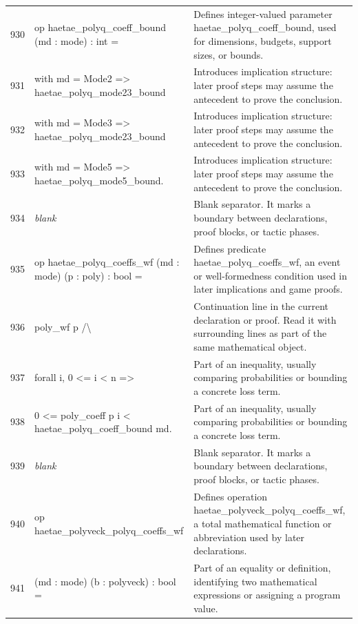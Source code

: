 \documentclass[10pt]{article}
\begin{document}
\begin{longtable}{r L{0.53\textwidth} L{0.37\textwidth}}
930 & {\ttfamily\scriptsize op haetae\_polyq\_coeff\_bound (md : mode) : int =} & Defines integer-valued parameter haetae\_polyq\_coeff\_bound, used for dimensions, budgets, support sizes, or bounds. \\
931 & {\ttfamily\scriptsize   with md = Mode2 => haetae\_polyq\_mode23\_bound} & Introduces implication structure: later proof steps may assume the antecedent to prove the conclusion. \\
932 & {\ttfamily\scriptsize   with md = Mode3 => haetae\_polyq\_mode23\_bound} & Introduces implication structure: later proof steps may assume the antecedent to prove the conclusion. \\
933 & {\ttfamily\scriptsize   with md = Mode5 => haetae\_polyq\_mode5\_bound.} & Introduces implication structure: later proof steps may assume the antecedent to prove the conclusion. \\
934 & {\ttfamily\scriptsize \emph{blank}} & Blank separator.  It marks a boundary between declarations, proof blocks, or tactic phases. \\
935 & {\ttfamily\scriptsize op haetae\_polyq\_coeffs\_wf (md : mode) (p : poly) : bool =} & Defines predicate haetae\_polyq\_coeffs\_wf, an event or well-formedness condition used in later implications and game proofs. \\
936 & {\ttfamily\scriptsize   poly\_wf p /\textbackslash{}} & Continuation line in the current declaration or proof.  Read it with surrounding lines as part of the same mathematical object. \\
937 & {\ttfamily\scriptsize   forall i, 0 <= i < n =>} & Part of an inequality, usually comparing probabilities or bounding a concrete loss term. \\
938 & {\ttfamily\scriptsize     0 <= poly\_coeff p i < haetae\_polyq\_coeff\_bound md.} & Part of an inequality, usually comparing probabilities or bounding a concrete loss term. \\
939 & {\ttfamily\scriptsize \emph{blank}} & Blank separator.  It marks a boundary between declarations, proof blocks, or tactic phases. \\
940 & {\ttfamily\scriptsize op haetae\_polyveck\_polyq\_coeffs\_wf} & Defines operation haetae\_polyveck\_polyq\_coeffs\_wf, a total mathematical function or abbreviation used by later declarations. \\
941 & {\ttfamily\scriptsize    (md : mode) (b : polyveck) : bool =} & Part of an equality or definition, identifying two mathematical expressions or assigning a program value. \\

\end{longtable}
\end{document}
